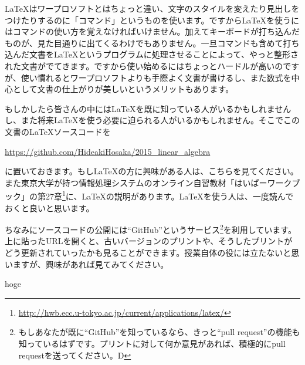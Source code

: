\LaTeX はワープロソフトとはちょっと違い、文字のスタイルを変えたり見出しをつけたりするのに「コマンド」というものを使います。ですから\LaTeX を使うにはコマンドの使い方を覚えなければいけません。加えてキーボードが打ち込んだものが、見た目通りに出てくるわけでもありません。一旦コマンドも含めて打ち込んだ文書を\LaTeX というプログラムに処理させることによって、やっと整形された文書がでてきます。ですから使い始めるにはちょっとハードルが高いのですが、使い慣れるとワープロソフトよりも手際よく文書が書けるし、また数式を中心として文書の仕上がりが美しいというメリットもあります。

もしかしたら皆さんの中には\LaTeX を既に知っている人がいるかもしれませんし、また将来\LaTeX を使う必要に迫られる人がいるかもしれません。そこでこの文書の\LaTeX ソースコードを
\begin{center}
\url{https://github.com/HideakiHosaka/2015_linear_algebra}
\end{center}
に置いておきます。もし\LaTeX の方に興味がある人は、こちらを見てください。また東京大学が持つ情報処理システムのオンライン自習教材「はいぱーワークブック」の第27章\footnote{\url{http://hwb.ecc.u-tokyo.ac.jp/current/applications/latex/}}に、\LaTeX の説明があります。\LaTeX を使う人は、一度読んでおくと良いと思います。

ちなみにソースコードの公開には``GitHub''というサービス\footnote{もしあなたが既に``GitHub''を知っているなら、きっと``pull request''の機能も知っているはずです。プリントに対して何か意見があれば、積極的にpull requestを送ってください。\textsf{\raisebox{1pt}{:}D}}を利用しています。上に貼ったURLを開くと、古いバージョンのプリントや、そうしたプリントがどう更新されていったかも見ることができます。授業自体の役には立たないと思いますが、興味があれば見てみてください。

\newpage

hoge


